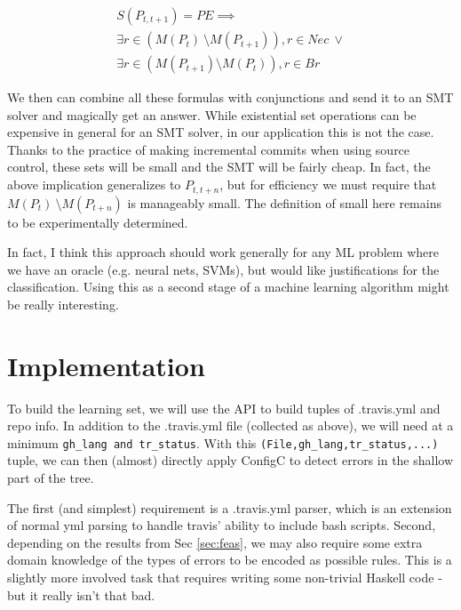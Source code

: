 \documentclass{sigplanconf}
\begin{document}
\begin{align*}
  S(P_{t,t+1}) = PE \implies \\
  \exists r \in (M(P_{t})\ \setminus M(P_{t+1})), r \in Nec\ \lor \\
  \exists r \in (M(P_{t+1}) \setminus M(P_{t})), r \in Br
\end{align*}


We then can combine all these formulas with conjunctions and send it to an SMT solver and magically get an answer.
While existential set operations can be expensive in general for an SMT solver, in our application this is not the case.
Thanks to the practice of making incremental commits when using source control, these sets will be small and the SMT will be fairly cheap.
In fact, the above implication generalizes to $P_{t,t+n}$, but for efficiency we must require that $M(P_{t})\ \setminus M(P_{t+n})$ is manageably small.
The definition of small here remains to be experimentally determined.

In fact, I think this approach should work generally for any ML problem where we have an oracle (e.g. neural nets, SVMs), but would like justifications for the classification.
Using this as a second stage of a machine learning algorithm might be really interesting.

\section{Implementation}

To build the learning set, we will use the API to build tuples of .travis.yml and repo info.
In addition to the .travis.yml file (collected as above), we will need at a minimum \verb|gh_lang and tr_status|.
With this \verb|(File,gh_lang,tr_status,...)| tuple, we can then (almost) directly apply ConfigC to detect errors in the shallow part of the tree.

The first (and simplest) requirement is a .travis.yml parser, which is an extension of normal yml parsing to handle travis' ability to include bash scripts.
Second, depending on the results from Sec \ref{sec:feas}, we may also require some extra domain knowledge of the types of errors to be encoded as possible rules.
This is a slightly more involved task that requires writing some non-trivial Haskell code - but it really isn't that bad.






\end{document}
